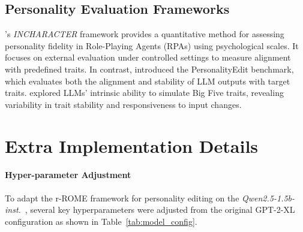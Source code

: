 \subsection{Personality Evaluation Frameworks} 
\citet{wang-etal-2024-incharacter}'s \textit{INCHARACTER} framework provides a quantitative method for assessing personality fidelity in Role-Playing Agents (RPAs) using psychological scales. It focuses on external evaluation under controlled settings to measure alignment with predefined traits.
In contrast, \citet{mao2024editingpersonalitylargelanguage} introduced the PersonalityEdit benchmark, which evaluates both the alignment and stability of LLM outputs with target traits. 
\citet{sorokovikova2024llmssimulatebigpersonality} explored LLMs’ intrinsic ability to simulate Big Five traits, revealing variability in trait stability and responsiveness to input changes.



\section{Extra Implementation Details}
\label{appendix:extra_implementation}
\paragraph{Hyper-parameter Adjustment}
To adapt the r-ROME framework for personality editing on the \textit{Qwen2.5-1.5b-inst.}~\citep{yang2024qwen2}, several key hyperparameters were adjusted from the original GPT-2-XL configuration as shown in Table~\ref{tab:model_config}.

